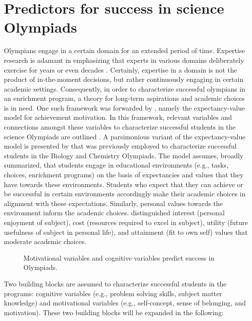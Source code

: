 \documentclass[D:/studies/WinnerS/Erhebungen/IPhO1718/paper/problem_solving/main/TaylorFrancis/interactapasample]{subfiles}
\begin{document}
\section{Predictors for success in science Olympiads}

Olympians engage in a certain domain for an extended period of time. Expertise research is adamant in emphasizing that experts in various domains deliberately exercise for years or even decades \citep{Simon.1983}. Certainly, expertise in a domain is not the product of in-the-moment decisions, but rather continuously engaging in certain academic settings. Consequently, in order to characterize successful olympians in an enrichment program, a theory for long-term aspirations and academic choices is in need. One such framework was forwarded by \cite{Eccles.1983}, namely the expectancy-value model for achievement motivation. In this framework, relevant variables and connections amongst these variables to characterize successful students in the science Olympiads are outlined \cite{Eccles.1983,Urhahne.2012}. A parsimonious variant of the expectancy-value model is presented by \cite{Urhahne.2012} that was previously employed to characterize successful students in the Biology and Chemistry Olympiads. The model assumes, broadly summarized, that students engage in educational environments (e.g., tasks, choices, enrichment programs) on the basis of expectancies and values that they have towards these environments. Students who expect that they can achieve or be successful in certain environments accordingly make their academic choices in alignment with these expectations. Similarly, personal values towards the environment inform the academic choices. \cite{Eccles.1983} distinguished interest (personal enjoyment of subject), cost (resources required to excel in subject), utility (future usefulness of subject in personal life), and attainment (fit to own self) values that moderate academic choices. 

\begin{figure}
\centering

\caption{Motivational variables and cognitive variables predict success in Olympiads.}
\label{Fig:model}
\end{figure}


Two building blocks are assumed to characterize successful students in the programs: cognitive variables (e.g., problem solving skills, subject matter knowledge) and motivational variables (e.g., self-concept, sense of belonging, and motivation). These two building blocks will be expanded in the following:
\end{document}
